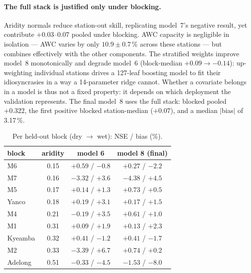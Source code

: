 \documentclass[11pt,a4paper]{article}
\begin{document}
\paragraph{The full stack is justified only under blocking.} Aridity normals
reduce station-out skill, replicating model~7's negative result, yet
contribute $+0.03$--$0.07$ pooled under blocking. AWC capacity is negligible
in isolation --- AWC varies by only $10.9 \pm 0.7$\,\% across these stations
--- but combines effectively with the other components. The stratified
weights improve model~8 monotonically and degrade model~6 (block-median
$+0.09 \to -0.14$): up-weighting individual stations drives a 127-leaf
boosting model to fit their idiosyncrasies in a way a 14-parameter ridge
cannot. Whether a covariate belongs in a model is thus not a fixed property:
it depends on which deployment the validation represents. The final model~8
uses the full stack: blocked pooled $+0.322$, the first positive blocked
station-median ($+0.07$), and a median $|$bias$|$ of 3.17\,\%.

\begin{table}[htbp]
\centering
\caption{Per held-out block (dry $\to$ wet): NSE / bias (\%).}
\label{tab:perblock}
\small
\begin{tabular}{lccc}
\toprule
block & aridity & model 6 & model 8 (final) \\
\midrule
M6      & 0.15 & $\mathbf{+0.59}$ / $-0.8$ & $+0.27$ / $-2.2$ \\
M7      & 0.16 & $-3.32$ / $+3.6$          & $-4.38$ / $+4.5$ \\
M5      & 0.17 & $+0.14$ / $+1.3$          & $\mathbf{+0.73}$ / $+0.5$ \\
Yanco   & 0.18 & $+0.19$ / $+3.1$          & $+0.17$ / $+1.5$ \\
M4      & 0.21 & $-0.19$ / $+3.5$          & $\mathbf{+0.61}$ / $+1.0$ \\
M1      & 0.31 & $+0.09$ / $+1.9$          & $+0.13$ / $+2.3$ \\
Kyeamba & 0.32 & $+0.41$ / $-1.2$          & $+0.41$ / $-1.7$ \\
M2      & 0.33 & $-3.39$ / $+6.7$          & $\mathbf{+0.74}$ / $+0.2$ \\
Adelong & 0.51 & $-0.33$ / $-4.5$          & $-1.53$ / $-8.0$ \\
\bottomrule
\end{tabular}
\end{table}
\end{document}
